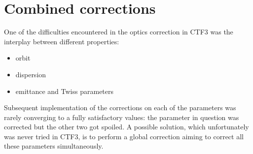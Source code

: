 \section{Combined corrections}

One of the difficulties encountered in the optics correction in CTF3 was 
the interplay between different properties:
\begin{itemize}
\item orbit
\item dispersion
\item emittance and Twiss parameters
\end{itemize}
Subsequent implementation of the corrections on each of the parameters was rarely converging
to a fully satisfactory values: the parameter in question was corrected but the other two
got spoiled. A possible solution, which unfortunately was never tried in CTF3,
is to perform a global correction aiming to correct all these parameters simultaneously.
